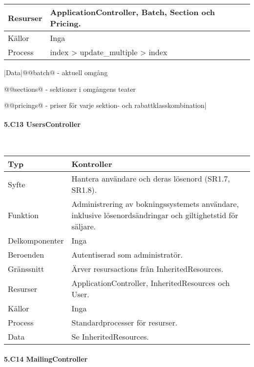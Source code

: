\documentclass[a4paper, twoside, 11pt, titlepage]{article}
\begin{document}
			\begin {table} [ht] \begin{tabular} {  p{3.5cm} p{9.6cm} }
				\hline
				Resurser & ApplicationController, Batch, Section och Pricing.  \\
				\hline
				Källor & Inga  \\
				\hline
				Process & index > update\_multiple > index  \\
				\hline
			\end{tabular} \end{table} \FloatBarrier
			\vspace{6mm}

			|Data|@@batch@ - aktuell omgång

			@@sections@ - sektioner i omgångens teater

			@@pricings@ - priser för varje sektion- och rabattklasskombination|

			\paragraph{5.C13 UsersController}\

			\begin {table} [ht] \begin{tabular} {  p{3.5cm} p{9.6cm} }
				\hline
				Typ & Kontroller  \\
				\hline
				Syfte & Hantera användare och deras lösenord (SR1.7, SR1.8).  \\
				\hline
				Funktion & Administrering av bokningssystemets användare, inklusive lösenordsändringar och giltighetstid för säljare.  \\
				\hline
				Delkomponenter & Inga  \\
				\hline
				Beroenden & Autentiserad som administratör.  \\
				\hline
				Gränssnitt & Ärver resursactions från InheritedResources.  \\
				\hline
				Resurser & ApplicationController, InheritedResources och User.  \\
				\hline
				Källor & Inga  \\
				\hline
				Process & Standardprocesser för resurser.  \\
				\hline
				Data & Se InheritedResources.  \\
				\hline
			\end{tabular} \end{table} \FloatBarrier


			\paragraph{5.C14 MailingController}\
\end{document}
